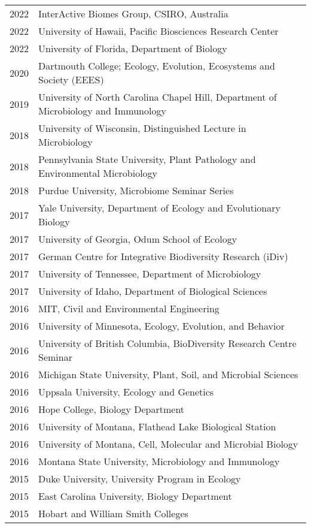 \documentclass[11pt]{article}
\begin{document}
\begin{longtable}{@{}p{3em}@{\hspace{1.5em}}p{}@{}}
2022 & InterActive Biomes Group, CSIRO, Australia \\
2022 & University of Hawaii, Pacific Biosciences Research Center \\
2022 & University of Florida, Department of Biology \\
2020 & Dartmouth College; Ecology, Evolution, Ecosystems and Society (EEES) \\
2019 & University of North Carolina Chapel Hill, Department of Microbiology and Immunology \\
2018 & University of Wisconsin, Distinguished Lecture in Microbiology \\
2018 & Pennsylvania State University, Plant Pathology and Environmental Microbiology \\
2018 & Purdue University, Microbiome Seminar Series \\
2017 & Yale University, Department of Ecology and Evolutionary Biology \\
2017 & University of Georgia, Odum School of Ecology \\
2017 & German Centre for Integrative Biodiversity Research (iDiv) \\
2017 & University of Tennessee, Department of Microbiology \\
2017 & University of Idaho, Department of Biological Sciences \\
2016 & MIT, Civil and Environmental Engineering \\
2016 & University of Minnesota, Ecology, Evolution, and Behavior \\
2016 & University of British Columbia, BioDiversity Research Centre Seminar \\
2016 & Michigan State University, Plant, Soil, and Microbial Sciences \\
2016 & Uppsala University, Ecology and Genetics \\
2016 & Hope College, Biology Department \\
2016 & University of Montana, Flathead Lake Biological Station \\
2016 & University of Montana, Cell, Molecular and Microbial Biology \\
2016 & Montana State University, Microbiology and Immunology \\
2015 & Duke University, University Program in Ecology \\
2015 & East Carolina University, Biology Department \\
2015 & Hobart and William Smith Colleges \\

\end{longtable}
\end{document}
